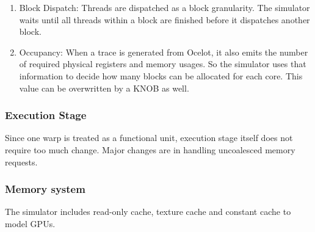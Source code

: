 \begin{enumerate}
\item Block Dispatch: Threads are dispatched as a block granularity. 
The simulator waits until all threads within a block are finished 
before it dispatches another block. 
\item Occupancy: When a trace is generated from Ocelot, it also emits the number of required 
physical registers and memory usages. So the simulator uses that information to decide 
how many blocks can be allocated for each core. This value can be overwritten by a KNOB as well. 
\end{enumerate}

\subsubsection{Execution Stage}
Since one warp is treated as a functional unit, execution stage itself does not require too much change. Major changes are in handling uncoalesced memory  requests. 

\subsubsection{Memory system}
The simulator includes read-only cache, texture cache and constant cache to model GPUs. 

